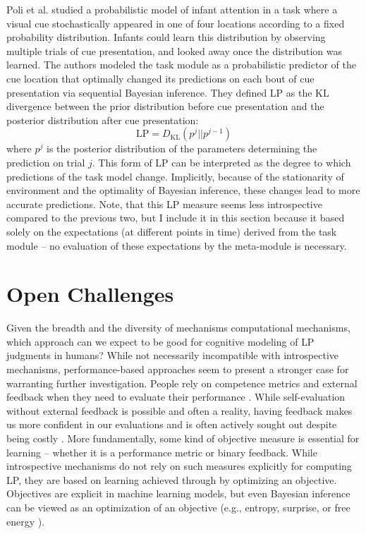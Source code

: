 Poli et al. \cite{poli_infants_2020} studied a probabilistic model of infant attention in a task where a visual cue stochastically appeared in one of four locations according to a fixed probability distribution. Infants could learn this distribution by observing multiple trials of cue presentation, and looked away once the distribution was learned. The authors modeled the task module as a probabilistic predictor of the cue location that optimally changed its predictions on each bout of cue presentation via sequential Bayesian inference. They defined \ac{LP} as the KL divergence between the prior distribution before cue presentation and the posterior distribution after cue presentation:
\begin{equation}
    \mathrm{LP} = D_{\mathrm{KL}}(p^j||p^{j-1})
\end{equation}
where $p^j$ is the posterior distribution of the parameters determining the prediction on trial $j$. This form of \ac{LP} can be interpreted as the degree to which predictions of the task model change. Implicitly, because of the stationarity of environment and the optimality of Bayesian inference, these changes lead to more accurate predictions. Note, that this \ac{LP} measure seems less introspective compared to the previous two, but I include it in this section because it based solely on the expectations (at different points in time) derived from the task module -- no evaluation of these expectations by the meta-module is necessary. 

\section{Open Challenges}

Given the breadth and the diversity of mechanisms computational mechanisms, which approach can we expect to be good for cognitive modeling of \ac{LP} judgments in humans? While not necessarily incompatible with introspective mechanisms, performance-based approaches seem to present a stronger case for warranting further investigation. People rely on competence metrics and external feedback when they need to evaluate their performance \cite{marti_certainty_2018,desender_subjective_2018,locke_performance_2020}. While self-evaluation without external feedback is possible and often a reality, having feedback makes us more confident in our evaluations \cite{rouault_forming_2019} and is often actively sought out despite being costly \cite{holm_episodic_2019,fitzgibbon_lure_2021}. More fundamentally, some kind of objective measure is essential for learning -- whether it is a performance metric or binary feedback. While introspective mechanisms do not rely on such measures explicitly for computing \ac{LP}, they are based on learning achieved through by optimizing an objective. Objectives are explicit in machine learning models, but even Bayesian inference can be viewed as an optimization of an objective (e.g., entropy, surprise, or free energy \cite{friston_free-energy_2009}).

